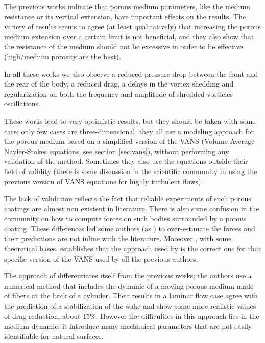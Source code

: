 The previous works indicate that porous medium parameters, like the medium resistance or its vertical extension, have important effects on the results.
The variety of results seems to agree (at least qualitatively) that increasing the porous medium extension over a certain limit is not beneficial, and they also show that the resistance of the medium should not be excessive in order to be effective (high/medium porosity are the best).

In all these works we also observe a reduced pressure drop between the front and the rear of the body, a reduced drag, a delays in the vortex shedding and regularization on both the frequency and amplitude of shredded vorticies oscillations.

These works lead to very optimistic results, but they should be taken with some care; only few cases are three-dimensional, they all use a modeling approach for the porous medium based on a simplified version of the VANS (Volume Average Navier-Stokes equations, see section \ref{sec:vans}), without performing any validation of the method.
Sometimes they also use the equations outside their field of validity (there is some discussion in the scientific community in using the previous version of VANS equations for highly turbulent flows).

The lack of validation reflects the fact that reliable experiments of such porous coatings are almost non existent in literature.
There is also some confusion in the community on how to compute forces on such bodies surrounded by a porous coating. These differences led some authors (as \citet{naito2012numerical}) to over-estimate the forces and their predictions are not inline with the literature.
Moreover \citet{caltagirone1994interaction}, with some theoretical bases, establishes that the approach used by \citet{bruneau2004passive} is the correct one for that specific version of the VANS used by all the previous authors. 

The approach of \citet{favier2009passive} differentiates itself from the previous works; the authors use a numerical method that includes the dynamic of a moving porous medium made of fibers at the back of a cylinder.
Their results in a laminar flow case agree with the prediction of a stabilization of the wake and show some more realistic values of drag reduction, about $15\%$.
However the difficulties in this approach lies in the medium dynamic; it introduce many mechanical parameters that are not easily identifiable for natural surfaces.

